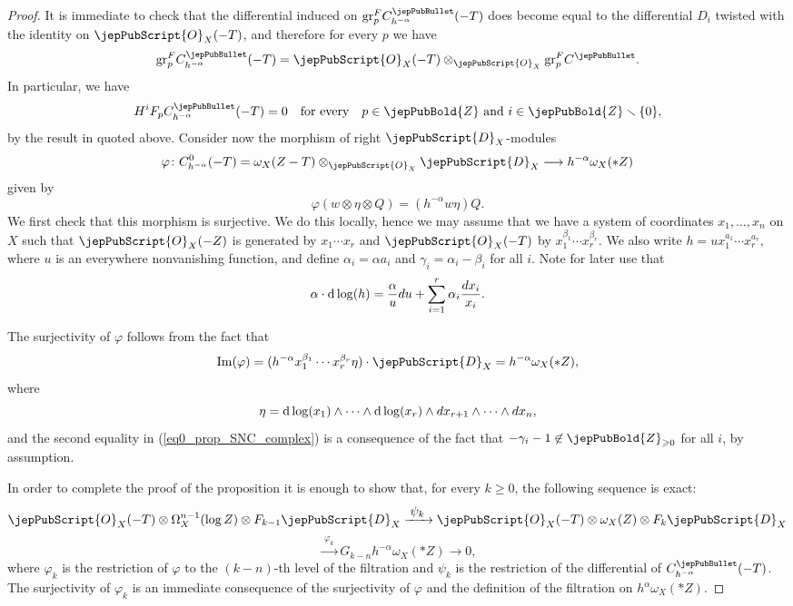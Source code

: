 \begin{proof}
It is immediate to check that the differential induced on ${\rm gr}^F_pC^{\jepPubBullet}_{h^{-\alpha}}(-T)$ does become 
equal to the differential $D_i$ twisted with the identity on $\jepPubScript{O}_X(-T)$, and therefore for every $p$ we have
$${\rm gr}^F_pC^{\jepPubBullet}_{h^{-\alpha}}(-T)=\jepPubScript{O}_X(-T)\otimes_{\jepPubScript{O}_X}{\rm gr}^F_pC^{\jepPubBullet}.$$
In particular, we have 
$$H^iF_pC^{\jepPubBullet}_{h^{-\alpha}}(-T)=0\quad\text{for every}\quad p\in\jepPubBold{Z}\,\,\text{and}\,\, i\in\jepPubBold{Z}\smallsetminus\{0\},$$
by the result in \cite{MP1} quoted above. Consider now the morphism of right $\jepPubScript{D}_X$-modules
$$\varphi\colon C^0_{h^{-\alpha}}(-T) = \omega_X (Z - T)\otimes_{\jepPubScript{O}_X} \jepPubScript{D}_X \longrightarrow 
h^{-\alpha}\omega_X(*Z)$$
given by 
$$\varphi(w\otimes\eta\otimes Q)=(h^{-\alpha}w\eta)Q.$$
We first check that this morphism is surjective. We do this locally, hence we may assume that we have a system of coordinates $x_1,\ldots,x_n$ on $X$ such that $\jepPubScript{O}_X(-Z)$ is generated by $x_1\cdots x_r$ and $\jepPubScript{O}_X(-T)$ by $x_1^{\beta_1}\cdots
x_r^{\beta_r}$. We also write $h=u x_1^{a_1}\cdots x_r^{a_r},$ where $u$ is an everywhere nonvanishing function, 
and define $\alpha_i=\alpha a_i$ and $\gamma_i=\alpha_i-\beta_i$ for all $i$. Note for later use that
$$\alpha\cdot {\rm d\log}(h)=\frac{\alpha}{u}du+\sum_{i=1}^r\alpha_i\frac{dx_i}{x_i}.$$

The surjectivity of $\varphi$ follows from the fact that 
\begin{equation}\label{eq0_prop_SNC_complex}
{\rm Im}(\varphi)=(h^{-\alpha}x_1^{\beta_1}\cdots x_r^{\beta_r}\eta)\cdot\jepPubScript{D}_X=h^{-\alpha}\omega_X(*Z),
\end{equation}
where $$\eta={\rm d\log}(x_1)\wedge\cdots\wedge
{\rm d\log}(x_r)\wedge dx_{r+1}\wedge\cdots\wedge dx_n,$$ and the second equality in (\ref{eq0_prop_SNC_complex})
   is a consequence of the fact that $-\gamma_i-1\not\in \jepPubBold{Z}_{\geqslant 0}$ for all $i$, by assumption.

In order to complete the proof of the proposition it is enough to show
that, for every $k\geqslant 0$, the following sequence is exact:
$$
\jepPubScript{O}_X(-T)\otimes\Omega_X^{n-1}(\log Z)\otimes F_{k-1}\jepPubScript{D}_X\xrightarrow{\;\textstyle\psi_k\;}\jepPubScript{O}_X(-T)\otimes \omega_X(Z)\otimes F_k\jepPubScript{D}_X$$ 
$$\xrightarrow{\;\textstyle\varphi_k\;} G_{k-n} h^{-\alpha}\omega_X(*Z) \longrightarrow 0,
$$
where $\varphi_k$ is the restriction of $\varphi$ to the $(k-n)$-th level of the filtration and $\psi_k$ is the restriction of the  differential of  $C^{\jepPubBullet}_{h^{-\alpha}}(-T)$.
The surjectivity of $\varphi_k$ is an immediate consequence of the surjectivity of $\varphi$ and the definition of the filtration on $h^{\alpha}\omega_X(*Z)$.




\end{proof}
